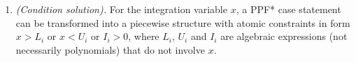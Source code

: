 \documentclass[letterpaper]{article}
\newcommand{\case}[2]{#2 &\text{ if } #1}%
\begin{document}
\begin{enumerate}[leftmargin=2.6ex]
\item \emph{(Condition solution).} For the integration variable $x$, 
a PPF* case statement can be transformed into a piecewise structure 
with atomic constraints in form $x>L_i$ or $x<U_i$ or $I_i>0$, 
where $L_i$, $U_i$ and $I_i$ are 
algebraic expressions (not necessarily polynomials) that do not involve $x$. 


\end{enumerate}
\end{document}
